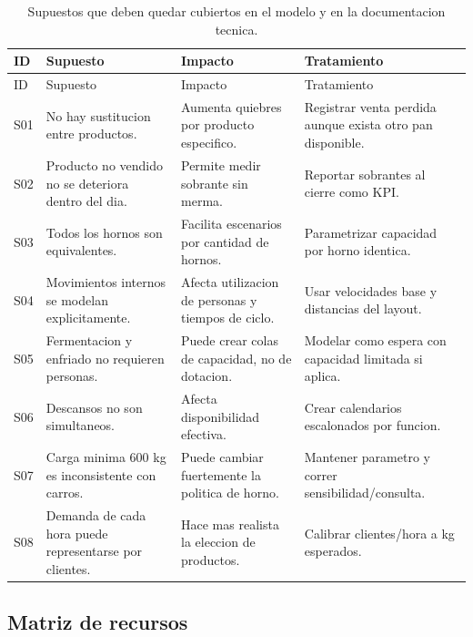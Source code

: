 \documentclass[12pt]{article}
\begin{document}
\begin{longtable}{L{1.4cm}L{4.1cm}L{4.1cm}L{4.9cm}}
\caption{Supuestos que deben quedar cubiertos en el modelo y en la documentacion tecnica.}\\
\toprule
{}
\color{white}ID & \color{white}Supuesto & \color{white}Impacto & \color{white}Tratamiento \\
\midrule
\endfirsthead
\toprule
{}
\color{white}ID & \color{white}Supuesto & \color{white}Impacto & \color{white}Tratamiento \\
\midrule
\endhead
S01 & No hay sustitucion entre productos. & Aumenta quiebres por producto especifico. & Registrar venta perdida aunque exista otro pan disponible. \\
S02 & Producto no vendido no se deteriora dentro del dia. & Permite medir sobrante sin merma. & Reportar sobrantes al cierre como KPI. \\
S03 & Todos los hornos son equivalentes. & Facilita escenarios por cantidad de hornos. & Parametrizar capacidad por horno identica. \\
S04 & Movimientos internos se modelan explicitamente. & Afecta utilizacion de personas y tiempos de ciclo. & Usar velocidades base y distancias del layout. \\
S05 & Fermentacion y enfriado no requieren personas. & Puede crear colas de capacidad, no de dotacion. & Modelar como espera con capacidad limitada si aplica. \\
S06 & Descansos no son simultaneos. & Afecta disponibilidad efectiva. & Crear calendarios escalonados por funcion. \\
S07 & Carga minima 600 kg es inconsistente con carros. & Puede cambiar fuertemente la politica de horno. & Mantener parametro y correr sensibilidad/consulta. \\
S08 & Demanda de cada hora puede representarse por clientes. & Hace mas realista la eleccion de productos. & Calibrar clientes/hora a kg esperados. \\
\bottomrule
\end{longtable}

\subsection{Matriz de recursos}
\end{document}
